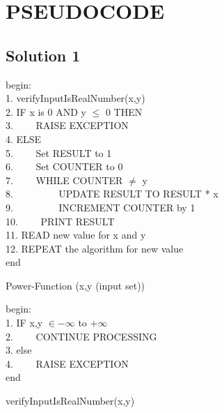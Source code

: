\documentclass[a4paper,12pt]{article}
\begin{document}


\section{PSEUDOCODE}

\subsection{Solution 1}
\begin{algorithm}[H]
	begin: \\
	1. verifyInputIsRealNumber(x,y)\\
	2. IF x is 0 AND y $\leq$ 0 THEN \\
	3. $\hspace{2em}$RAISE EXCEPTION	\\
	4. ELSE \\
	5. $\hspace{2em}$Set RESULT to 1 \\
	6. $\hspace{2em}$Set COUNTER to 0\\
	7. $\hspace{2em}$WHILE COUNTER $\neq$ y \\
	8. $\hspace{4em}$ UPDATE RESULT TO RESULT * x\\
	9. $\hspace{4em}$ INCREMENT COUNTER by 1\\
	10.$\hspace{2em}$ PRINT RESULT \\
	11. READ new value for x and y\\
	12. REPEAT the algorithm for new value \\
	end
	\caption{Power-Function (x,y (input set))}
\end{algorithm}

\vspace{0.5cm}

\begin{algorithm}
	begin:\\
	1. IF  x,y $\in -\infty$  to  +$\infty$ \\
	2. $\hspace{2em}$CONTINUE PROCESSING\\
	3. else\\
	4. $\hspace{2em}$RAISE EXCEPTION \\
	end
	\caption{verifyInputIsRealNumber(x,y)}
\end{algorithm}
\end{document}

